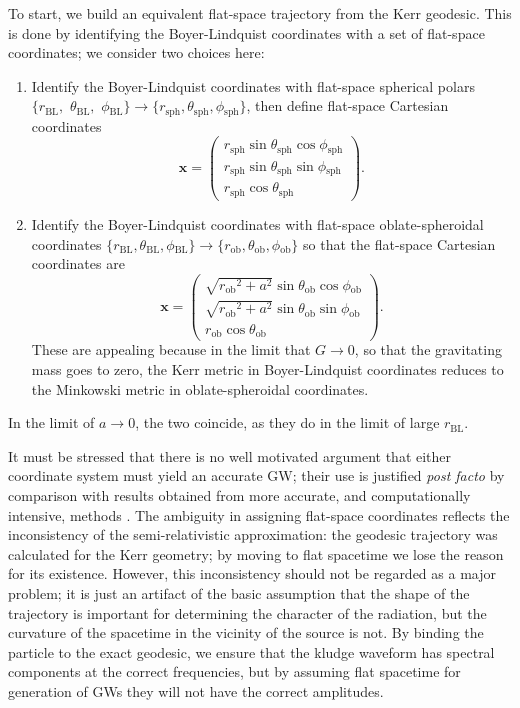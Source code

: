\documentclass[useAMS,usedcolumn,usegraphicx,usenatbib]{mn2e}
\newcommand{\sub}[1]{\ensuremath{_\mathrm{#1}}}
\begin{document}
To start, we build an equivalent flat-space trajectory from the Kerr geodesic. This is done by identifying the Boyer-Lindquist coordinates with a set of flat-space coordinates; we consider two choices here:
\begin{enumerate}
\item Identify the Boyer-Lindquist coordinates with flat-space spherical polars $\{r\sub{BL},$ $\theta\sub{BL},$ $\phi\sub{BL}\} \rightarrow \{r\sub{sph}, \theta\sub{sph}, \phi\sub{sph}\}$, then define flat-space Cartesian coordinates \citep{Gair2005, Babak2007}
\begin{equation}
\boldsymbol{x} = \begin{pmatrix}
r\sub{sph} \sin\theta\sub{sph}\cos\phi\sub{sph} \\
r\sub{sph} \sin\theta\sub{sph}\sin\phi\sub{sph} \\
r\sub{sph} \cos\theta\sub{sph}
\end{pmatrix}.
\end{equation}
\item Identify the Boyer-Lindquist coordinates with flat-space oblate-spheroidal coordinates $\{r\sub{BL}, \theta\sub{BL}, \phi\sub{BL}\} \rightarrow \{r\sub{ob}, \theta\sub{ob}, \phi\sub{ob}\}$ so that the flat-space Cartesian coordinates are
\begin{equation}
\boldsymbol{x} = \begin{pmatrix}
\sqrt{{r\sub{ob}}^2 + a^2} \sin\theta\sub{ob}\cos\phi\sub{ob} \\
\sqrt{{r\sub{ob}}^2 + a^2} \sin\theta\sub{ob}\sin\phi\sub{ob} \\
r\sub{ob} \cos\theta\sub{ob}
\end{pmatrix}.
\end{equation}
These are appealing because in the limit that $G \rightarrow 0$, so that the gravitating mass goes to zero, the Kerr metric in Boyer-Lindquist coordinates reduces to the Minkowski metric in oblate-spheroidal coordinates.
\end{enumerate}
In the limit of $a \rightarrow 0$, the two coincide, as they do in the limit of large $r\sub{BL}$.

It must be stressed that there is no well motivated argument that either coordinate system must yield an accurate GW; their use is justified {\it post facto} by comparison with results obtained from more accurate, and computationally intensive, methods \citep{Gair2005, Babak2007}. The ambiguity in assigning flat-space coordinates reflects the inconsistency of the semi-relativistic approximation: the geodesic trajectory was calculated for the Kerr geometry; by moving to flat spacetime we lose the reason for its existence. However, this inconsistency should not be regarded as a major problem; it is just an artifact of the basic assumption that the shape of the trajectory is important for determining the character of the radiation, but the curvature of the spacetime in the vicinity of the source is not. By binding the particle to the exact geodesic, we ensure that the kludge waveform has spectral components at the correct frequencies, but by assuming flat spacetime for generation of GWs they will not have the correct amplitudes.
\end{document}
